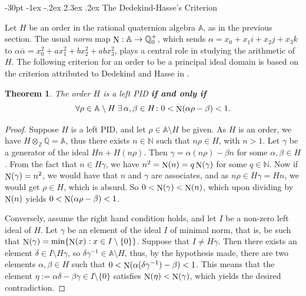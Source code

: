 \documentclass[10pt]{article}
\makeatletter
\renewcommand\section{\@startsection {section}{1}{\z@} {-30pt \@plus
    -1ex \@minus -.2ex} {2.3ex \@plus.2ex}
  {\normalfont\normalsize\bfseries\boldmath}}
\newtheorem{theorem}{Theorem}
\theoremstyle{definition}
\newcommand\A{\mathbb{A}}
\newcommand\NN{\mathbb{N}}
\newcommand\QQ{\mathbb{Q}}
\newcommand\ZZ{\mathbb{Z}}
\newcommand\N{\mathop{\rm N}\nolimits}
\makeatother
\begin{document}
\section{The Dedekind-Hasse's Criterion}\label{criterion}

Let $H$ be an order in the rational quaternion algebra $\A$, as in the
previous section. The usual \textit{norm} map $\N:\A\to \QQ_0^+$,
which sends $\alpha = x_0 + x_1 i + x_2 j + x_3 k$ to
$\alpha \overline{\alpha} = x_0^2 + a x_1^2 + b x_2^2 + ab x_3^2$,
plays a central role in studying the arithmetic of $H$.  The following
criterion for an order to be a principal ideal domain is based on the
criterion attributed to Dedekind and Hasse in \cite[Thm.~9.5,
p.~124]{Pollard_Diamond}.

\begin{theorem}\label{PID_criterion}
  The order $H$ is a left PID \textbf{if and only if}
  \begin{equation}\label{eq:criterion}
    \forall \rho \in \A \setminus H \; \exists \, \alpha, \beta \in H
    \colon 0<\N(\alpha \rho - \beta ) <1.
  \end{equation}
	
\end{theorem}

\begin{proof}
  Suppose $H$ is a left PID, and let $\rho \in \A \setminus H$ be
  given. As $H$ is an order, we have $H \otimes_\ZZ \QQ = \A$, thus
  there exists $n \in \NN$ such that $n \rho \in H$, with $n>1$. Let
  $\gamma$ be a generator of the ideal $Hn + H(n \rho)$. Then
  $\gamma = \alpha (n \rho) - \beta n$ for some $\alpha, \beta \in
  H$. From the fact that $ n \in H\gamma $, we have
  $n^2 = \N (n) = q \N(\gamma)$ for some $q \in \NN$. Now if
  $\N(\gamma)=n^2$, we would have that $n$ and $\gamma$ are
  associates, and as $n\rho \in H\gamma= H n$, we would get
  $\rho \in H$, which is absurd. So $0 < \N(\gamma) < \N(n)$, which
  upon dividing by $\N(n)$ yields $ 0 < \N(\alpha \rho - \beta) < 1$.
	
  Conversely, assume the right hand condition holds, and let $I$ be a
  non-zero left ideal of $H$. Let $ \gamma$ be an element of the ideal
  $I$ of minimal norm, that is, be such that
  $\N(\gamma) = \min\{\N(x): x \in I \setminus \{0\}\}$. Suppose that
  $I \not=H\gamma$. Then there exists an element
  $\delta \in I \setminus H \gamma $, so
  $\delta \gamma^{-1} \in \A \setminus H$, thus, by the hypothesis
  made, there are two elements $\alpha, \beta \in H $ such that
  $0<\N( \alpha (\delta \gamma^{-1}) - \beta ) <1$. This means that
  the element
  $\eta :=\alpha \delta - \beta \gamma \in I \setminus \{0\}$
  satisfies $\N(\eta)<\N(\gamma)$, which yields the desired
  contradiction.
\end{proof} 
\end{document}
